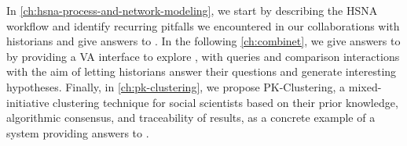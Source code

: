 In \autoref{ch:hsna-process-and-network-modeling}, we start by describing the HSNA workflow and identify recurring pitfalls we encountered in our collaborations with historians and give answers to \qone.
In the following \autoref{ch:combinet}, we give answers to \qtwo by providing a VA interface to explore \modelplural, with queries and comparison interactions with the aim of letting historians answer their questions and generate interesting hypotheses.
Finally, in \autoref{ch:pk-clustering}, we propose PK-Clustering, a mixed-initiative clustering technique for social scientists based on their prior knowledge, algorithmic consensus, and traceability of results, as a concrete example of a system providing answers to \qthree.










%





